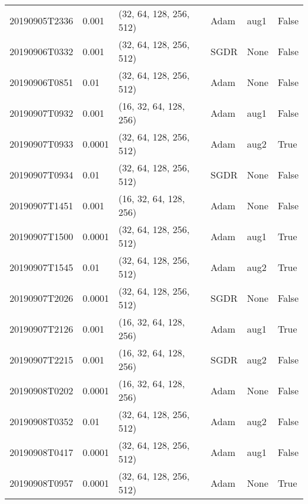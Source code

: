 \begin{table}[!ht]
\begin{tabular}{llllll}
			20190905T2336 &        0.001 &  (32, 64, 128, 256, 512) &      Adam &                  aug1 &                  False \\
			20190906T0332 &        0.001 &  (32, 64, 128, 256, 512) &      SGDR &                  None &                  False \\
			20190906T0851 &         0.01 &  (32, 64, 128, 256, 512) &      Adam &                  None &                  False \\
			20190907T0932 &        0.001 &   (16, 32, 64, 128, 256) &      Adam &                  aug1 &                  False \\
			20190907T0933 &       0.0001 &  (32, 64, 128, 256, 512) &      Adam &                  aug2 &                   True \\
			20190907T0934 &         0.01 &  (32, 64, 128, 256, 512) &      SGDR &                  None &                  False \\
			20190907T1451 &        0.001 &   (16, 32, 64, 128, 256) &      Adam &                  None &                  False \\
			20190907T1500 &       0.0001 &  (32, 64, 128, 256, 512) &      Adam &                  aug1 &                   True \\
			20190907T1545 &         0.01 &  (32, 64, 128, 256, 512) &      Adam &                  aug2 &                   True \\
			20190907T2026 &       0.0001 &  (32, 64, 128, 256, 512) &      SGDR &                  None &                  False \\
			20190907T2126 &        0.001 &   (16, 32, 64, 128, 256) &      Adam &                  aug1 &                   True \\
			20190907T2215 &        0.001 &   (16, 32, 64, 128, 256) &      SGDR &                  aug2 &                  False \\
			20190908T0202 &       0.0001 &   (16, 32, 64, 128, 256) &      Adam &                  None &                  False \\
			20190908T0352 &         0.01 &  (32, 64, 128, 256, 512) &      Adam &                  aug2 &                  False \\
			20190908T0417 &       0.0001 &  (32, 64, 128, 256, 512) &      Adam &                  aug1 &                  False \\
			20190908T0957 &       0.0001 &  (32, 64, 128, 256, 512) &      Adam &                  None &                   True \\

\end{tabular}
\end{table}
